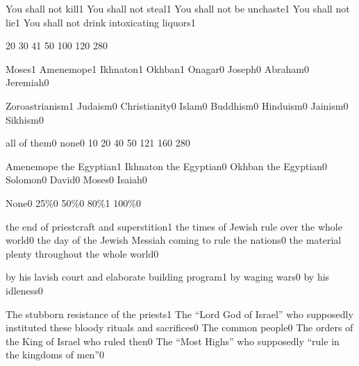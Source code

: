 {You shall not kill}{1}
{You shall not steal}{1}
{You shall not be unchaste}{1}
{You shall not lie}{1}
{You shall not drink intoxicating liquors}{1}
\qstop


{2}{0}
{3}{0}
{4}{1}
{5}{0}
{10}{0}
{12}{0}
{28}{0}
\qstop

{Moses}{1}
{Amenemope}{1}
{Ikhnaton}{1}
{Okhban}{1}
{Onagar}{0}
{Joseph}{0}
{Abraham}{0}
{Jeremiah}{0}
\qstop

{Zoroastrianism}{1}
{Judaism}{0}
{Christianity}{0}
{Islam}{0}
{Buddhism}{0}
{Hinduism}{0}
{Jainism}{0}
{Sikhism}{0}
\qstop

{all of them}{0}
{none}{0}
{1}{0}
{2}{0}
{4}{0}
{5}{0}
{12}{1}
{16}{0}
{28}{0}
\qstop

{Amenemope the Egyptian}{1}
{Ikhnaton the Egyptian}{0}
{Okhban the Egyptian}{0}
{Solomon}{0}
{David}{0}
{Moses}{0}
{Isaiah}{0}
\qstop



{None}{0}
{25\%}{0}
{50\%}{0}
{80\%}{1}
{100\%}{0}
\qstop

{the end of priestcraft and superstition}{1}
{the times of Jewish rule over the whole world}{0}
{the day of the Jewish Messiah coming to rule the nations}{0}
{the material plenty throughout the whole world}{0}
\qstop

{by his lavish court and elaborate building program}{1}
{by waging wars}{0}
{by his idleness}{0}
\qstop

{The stubborn resistance of the priests}{1}
{The ``Lord God of Israel'' who supposedly instituted these bloody rituals and sacrifices}{0}
{The common people}{0}
{The orders of the King of Israel who ruled then}{0}
{The ``Most Highs'' who supposedly ``rule in the kingdoms of men''}{0}
\qstop

